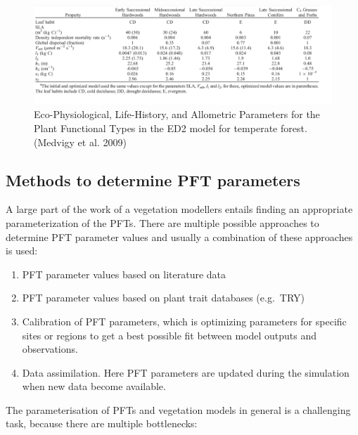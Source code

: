 \documentclass[12pt,oneside]{book}
\providecommand{\tightlist}{%
  \setlength{\itemsep}{0pt}\setlength{\parskip}{0pt}}
\begin{document}
\begin{figure}

{\centering \includegraphics[width=1\linewidth]{figures/chap7/f716_ED2_pft_values_table} 

}

\caption{Eco-Physiological, Life-History, and Allometric Parameters for the Plant Functional Types in the ED2 model for temperate forest. (Medvigy et al. 2009)}\label{fig:f716}
\end{figure}

\subsection{Methods to determine PFT
parameters}\label{methods-to-determine-pft-parameters}

A large part of the work of a vegetation modellers entails finding an
appropriate parameterization of the PFTs. There are multiple possible
approaches to determine PFT parameter values and usually a combination
of these approaches is used:

\begin{enumerate}
\def\labelenumi{\arabic{enumi}.}
\tightlist
\item
  PFT parameter values based on literature data
\item
  PFT parameter values based on plant trait databases (e.g.~TRY)
\item
  Calibration of PFT parameters, which is optimizing parameters for
  specific sites or regions to get a best possible fit between model
  outputs and observations.
\item
  Data assimilation. Here PFT parameters are updated during the
  simulation when new data become available.
\end{enumerate}

The parameterisation of PFTs and vegetation models in general is a
challenging task, because there are multiple bottlenecks:
\end{document}

